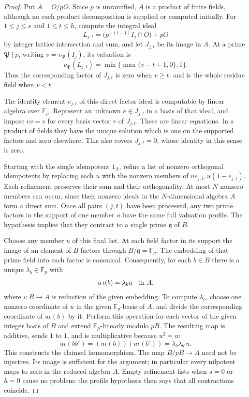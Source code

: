 \documentclass[11pt]{article}
\newcommand{\F}{\mathbb F}
\theoremstyle{definition}
\theoremstyle{remark}
\begin{document}
\begin{proof}
Put $A=O/pO$.  Since $p$ is unramified, $A$ is a product of
finite fields, although no such product decomposition is supplied
or computed initially.  For $1\le j\le s$ and $1\le t\le h$,
compute the integral ideal
\[
 L_{j,t}=\bigl(p^{-(t-1)}I_j\cap O\bigr)+pO
\]
by integer lattice intersection and sum, and let $J_{j,t}$ be
its image in $A$.  At a prime $\mathfrak P\mid p$, writing
$v=v_{\mathfrak P}(I_j)$, its valuation is
\[
 v_{\mathfrak P}(L_{j,t})
       =\min\{\max\{v-t+1,0\},1\}.
\]
Thus the corresponding factor of $J_{j,t}$ is zero when
$v\ge t$, and is the whole residue field when $v<t$.

The identity element $e_{j,t}$ of this direct-factor ideal is
computable by linear algebra over $\F_p$.  Represent an unknown
$e\in J_{j,t}$ in a basis of that ideal, and impose $ev=v$
for every basis vector $v$ of $J_{j,t}$.  These are linear
equations.  In a product of fields they have the unique solution
which is one on the supported factors and zero elsewhere.
This also covers $J_{j,t}=0$, whose identity in this sense is zero.

Starting with the single idempotent $1_A$, refine a list of
nonzero orthogonal idempotents by replacing each $u$ with the
nonzero members of $ue_{j,t},u(1-e_{j,t})$.  Each refinement
preserves their sum and their orthogonality.  At most $N$ nonzero
members can occur, since their nonzero ideals in the $N$-dimensional
algebra $A$ form a direct sum.  Once all pairs $(j,t)$ have been
processed, any two prime factors in the support of one member $u$
have the same full valuation profile.  The hypothesis implies
that they contract to a single prime $\mathfrak q$ of $B$.

Choose any member $u$ of this final list.  At each field factor
in its support the image of an element of $B$ factors through
$B/\mathfrak q=\F_p$.  The embedding of that prime field into
each factor is canonical.  Consequently, for each $b\in B$
there is a unique $\lambda_b\in\F_p$ with
\[
 u\,\iota(b)=\lambda_bu\quad\hbox{in }A,
\]
where $\iota:B\to A$ is reduction of the given embedding.
To compute $\lambda_b$, choose one nonzero coordinate of $u$
in the given $\F_p$-basis of $A$, and divide the corresponding
coordinate of $u\iota(b)$ by it.  Perform this operation for
each vector of the given integer basis of $B$ and extend
$\F_p$-linearly modulo $pB$.  The resulting map is additive,
sends $1$ to $1$, and is multiplicative because $u^2=u$:
\[
 u\iota(bb')=(u\iota(b))(u\iota(b'))
            =\lambda_b\lambda_{b'}u.
\]
This constructs the claimed homomorphism.  The map $B/pB\to A$
need not be injective.  Its image is sufficient for the argument;
in particular every nilpotent maps to zero in the reduced algebra
$A$.  Empty refinement lists when $s=0$ or $h=0$ cause no problem:
the profile hypothesis then says that all contractions coincide.


\end{proof}
\end{document}

